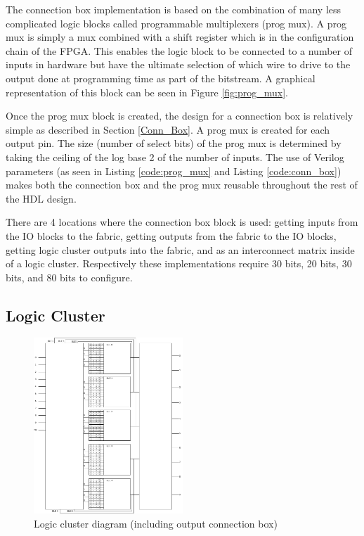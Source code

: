 \documentclass[12pt]{article}
\begin{document}
The connection box implementation is based on the combination of many less complicated
logic blocks called programmable multiplexers (prog mux). A prog mux is simply a mux combined with
a shift register which is in the configuration chain of the FPGA. This enables the logic
block to be connected to a number of inputs in hardware but have the ultimate selection
of which wire to drive to the output done at programming time as part of the bitstream. 
A graphical representation of this block can be seen in Figure \ref{fig:prog_mux}.

Once the prog mux block is created, the design for a connection box is relatively simple
as described in Section \ref{Conn_Box}. A prog mux is created for each output pin. The
size (number of select bits) of the prog mux is determined by taking the ceiling of
the log base 2 of the number of inputs.
The use of Verilog parameters (as seen in Listing \ref{code:prog_mux} and Listing \ref{code:conn_box})
makes both the connection box and the prog mux reusable
throughout the rest of the HDL design.

There are 4 locations where the connection box block is used: getting inputs from the
IO blocks to the fabric, getting outputs from the fabric to the IO blocks, getting
logic cluster outputs into the fabric, and as an interconnect matrix inside of a logic
cluster. Respectively these implementations require 30 bits, 20 bits, 30 bits, and 80 bits
to configure.

\subsection{Logic Cluster}

\begin{figure}[H]
    \centering
    \includegraphics[width=0.5\textwidth]{LogicCluster}
    \caption{Logic cluster diagram (including output connection box)}
    \label{fig:logic_cluster}
\end{figure}
\end{document}

